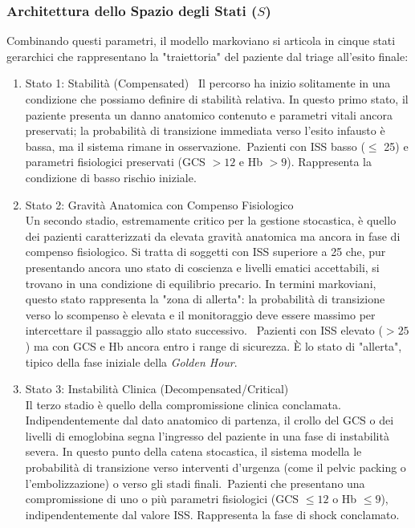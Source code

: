 \documentclass[11pt, oneside, noexaminfo]{sapthesis}   	%
\begin{document}
\subsubsection{Architettura dello Spazio degli Stati ($S$)}
Combinando questi parametri, il modello markoviano si articola in cinque stati gerarchici che rappresentano la "traiettoria" del paziente dal triage all'esito finale:

\begin{enumerate}
\item {Stato 1: Stabilità (Compensated)} \
Il percorso ha inizio solitamente in una condizione che possiamo definire di stabilità relativa. In questo primo stato, il paziente presenta un danno anatomico contenuto e parametri vitali ancora preservati; la probabilità di transizione immediata verso l'esito infausto è bassa, ma il sistema rimane in osservazione.\
Pazienti con ISS basso ($\le$ 25) e parametri fisiologici preservati (GCS $>12$  e Hb $> 9$). Rappresenta la condizione di basso rischio iniziale.

\item {Stato 2: Gravità Anatomica con Compenso Fisiologico} \\ 
Un secondo stadio, estremamente critico per la gestione stocastica, è quello dei pazienti caratterizzati da elevata gravità anatomica ma ancora in fase di compenso fisiologico. Si tratta di soggetti con ISS superiore a 25 che, pur presentando ancora uno stato di coscienza e livelli ematici accettabili, si trovano in una condizione di equilibrio precario. In termini markoviani, questo stato rappresenta la "zona di allerta": la probabilità di transizione verso lo scompenso è elevata e il monitoraggio deve essere massimo per intercettare il passaggio allo stato successivo. \
Pazienti con ISS elevato ($> 25$) ma con GCS e Hb ancora entro i range di sicurezza. È lo stato di "allerta", tipico della fase iniziale della \textit{Golden Hour}.

\item {Stato 3: Instabilità Clinica (Decompensated/Critical)} \\ 
Il terzo stadio è quello della compromissione clinica conclamata. Indipendentemente dal dato anatomico di partenza, il crollo del GCS o dei livelli di emoglobina segna l'ingresso del paziente in una fase di instabilità severa. In questo punto della catena stocastica, il sistema modella le probabilità di transizione verso interventi d'urgenza (come il pelvic packing o l'embolizzazione) o verso gli stadi finali.\
Pazienti che presentano una compromissione di uno o più parametri fisiologici (GCS $\leq 12$ o Hb $\leq 9$), indipendentemente dal valore ISS. Rappresenta la fase di shock conclamato.


\end{enumerate}
\end{document}
